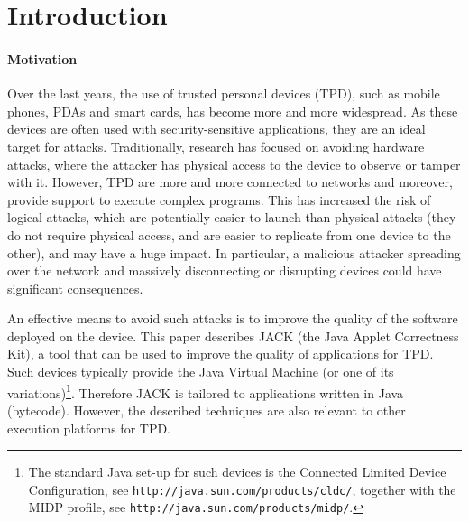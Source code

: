 \section{Introduction}\label{SecIntro}

\paragraph{Motivation}

Over the last years, the use of trusted personal devices (TPD), such
as mobile phones, PDAs and smart cards, has become more and more
widespread. As these devices are often used with security-sensitive
applications, they are an ideal target for attacks. Traditionally,
research has focused on avoiding hardware attacks, where the attacker
has physical access to the device to observe or tamper with
it. However, TPD are more and more connected to networks and moreover,
provide support to execute complex programs. This has increased the
risk of logical attacks, which are potentially easier to launch than
physical attacks (they do not require physical access, and are easier
to replicate from one device to the other), and may have a huge
impact.  In particular, a malicious attacker spreading over the
network and massively disconnecting or disrupting devices could have
significant consequences.

An effective means to avoid such attacks is to improve the quality of
the software deployed on the device. %
This paper describes JACK (the Java Applet Correctness Kit), a tool
that can be used to improve the quality of applications for TPD. Such
devices typically provide the Java Virtual Machine (or one of its
variations)\footnote{The standard Java set-up for such devices is the
Connected Limited Device Configuration, see
\texttt{http://java.sun.com/products/cldc/}, together with the MIDP
profile, see \texttt{http://java.sun.com/products/midp/}.}. Therefore
JACK is tailored to applications written in Java (bytecode). However,
the described techniques are also relevant to other execution
platforms for TPD.




